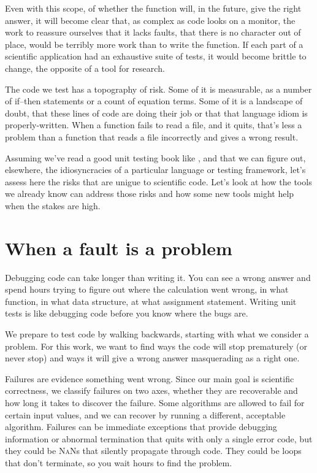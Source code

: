 \documentclass[fleqn,10pt]{olplainarticle}
\newcommand{\nan}{\textsc{NaN}\xspace}
\begin{document}
Even with this scope, of whether the function will, in the future,
give the right answer, it will become clear that, as complex as
code looks on a monitor, the work to reassure ourselves that it lacks
faults, that there is no character out of place, would be terribly more
work than to write the function. If each part of a scientific application
had an exhaustive suite of tests, it would become brittle to change,
the opposite of a tool for research.

The code we test has a topography of risk. Some of it is measurable,
as a number of if--then statements or a count of equation terms.
Some of it is a landscape of doubt, that these lines of code are
doing their job or that that language idiom is properly-written.
When a function fails to read a file, and it quits, that's less
a problem than a function that reads a file incorrectly and gives
a wrong result.

Assuming we've read a good unit testing book like \cite{jorgensen2013},
and that we can figure out, elsewhere, the idiosyncracies of a
particular language or testing framework,
let's assess here the risks that are unigue to scientific code.
Let's look at how the tools we already know can address those risks
and how some new tools might help when the stakes are high.



\section{When a fault is a problem}

Debugging code can take longer than writing it. You can see
a wrong answer and spend hours trying to figure out where the
calculation went wrong, in what function, in what data structure,
at what assignment statement.
Writing unit tests is like debugging code before you know
where the bugs are.

We prepare to test code by walking backwards, starting with
what we consider a problem. For this work, we want to find
ways the code will stop prematurely (or never stop)
and ways it will give a wrong answer masquerading as a right one.

Failures are evidence something went wrong. Since our main goal
is scientific correctness, we classify failures on two axes,
whether they are recoverable and how long it takes to discover
the failure. Some algorithms are allowed to fail for certain
input values, and we can recover by running a different, acceptable
algorithm. Failures can be immediate exceptions that provide
debugging information or abnormal termination that quits with
only a single error code, but they
could be \nan{}s that silently propagate through code. They
could be loops that don't terminate, so you wait hours to find
the problem.
\end{document}
